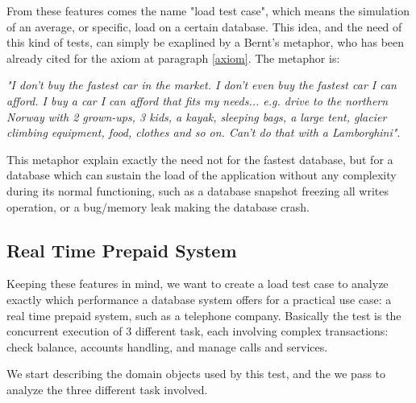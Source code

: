 From these features comes the name "load test case", which means the simulation of an average, or specific, load on a certain database. This idea, and the need of this kind of tests,  can simply be exaplined by a Bernt's metaphor, who has been already cited for the axiom at paragraph \ref{axiom}. The metaphor is:

\emph{"I don't buy the fastest car in the market. I don't even buy the fastest car I can afford. I buy a car I can afford that fits my needs... e.g. drive to the northern Norway with 2 grown-ups, 3 kids, a kayak, sleeping bags, a large tent, glacier climbing equipment, food, clothes and so on. Can't do that with a Lamborghini"}\cite{Bernt}.

This metaphor explain exactly the need not for the fastest database, but for a database which can sustain the load of the application without any complexity during its normal functioning, such as a database snapshot freezing all writes operation, or a bug/memory leak making the database crash.

		\subsection{Real Time Prepaid System}
Keeping these features in mind, we want to create a load test case to analyze exactly which performance  a database system  offers for a practical use case: a real time prepaid system, such as a telephone company. Basically the test is the concurrent execution of 3 different task, each involving complex transactions: check balance, accounts handling, and manage calls and services. 

We start describing the domain objects used by this test, and the we pass to analyze the three different task involved.
		
